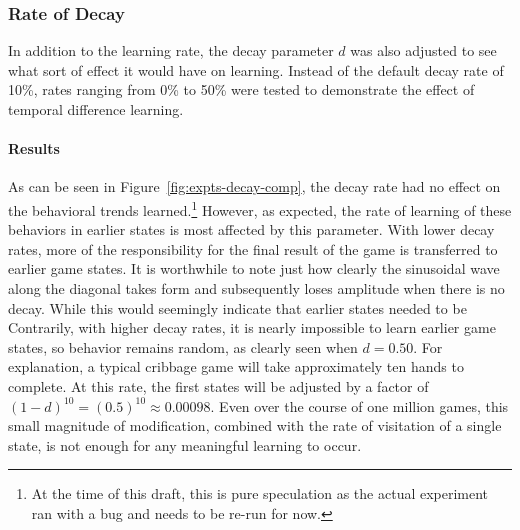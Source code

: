 
\subsubsection*{Rate of Decay}
\label{sec:findings-expts-decay}

In addition to the learning rate,
the decay parameter $d$ was also adjusted to see what sort of effect it
would have on learning.
%
Instead of the default decay rate of 10\%,
rates ranging from 0\% to 50\%
were tested to demonstrate the effect of temporal difference learning.

\paragraph*{Results}


As can be seen in Figure~\ref{fig:expts-decay-comp},
the decay rate had no effect on the behavioral trends learned.\footnote{
	At the time of this draft,
	this is pure speculation as the actual experiment ran with a bug and needs
	to be re-run for now.
}
%
However,
as expected,
the rate of learning of these behaviors in earlier states is most affected
by this parameter.
%
With lower decay rates,
more of the responsibility for the final result of the game is transferred
to earlier game states.
%
It is worthwhile to note just how clearly
the sinusoidal wave along the diagonal takes form
and subsequently loses amplitude
when there is no decay.
%
While this would seemingly indicate that earlier states needed to be
%
Contrarily,
with higher decay rates,
it is nearly impossible to learn earlier game states,
so behavior remains random,
as clearly seen when $d = 0.50$.
%
For explanation,
a typical cribbage game will take approximately ten hands
to complete.
%
At this rate,
the first states will be adjusted by a factor of
$(1-d)^{10} = (0.5)^{10} \approx 0.00098$.
%
Even over the course of one million games,
this small magnitude of modification,
combined with the rate of visitation of a single state,
is not enough for any meaningful learning to occur.



